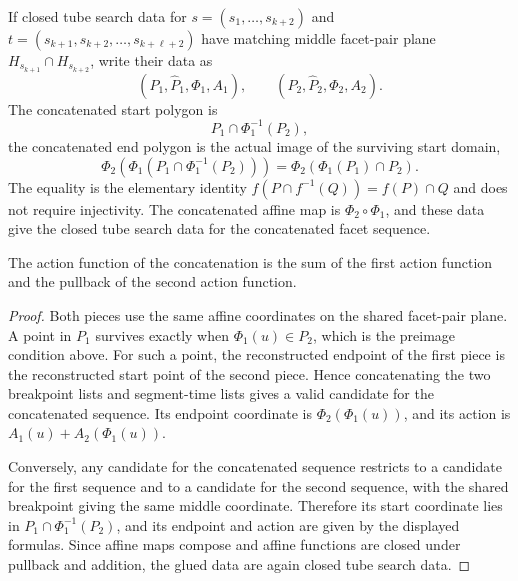 \begin{unverified}
\begin{lemma}\label{lem:fg-tube-gluing}
If closed tube search data for \(s=(s_1,\ldots,s_{k+2})\) and
\(t=(s_{k+1},s_{k+2},\ldots,s_{k+\ell+2})\) have matching middle
facet-pair plane \(H_{s_{k+1}}\cap H_{s_{k+2}}\), write their data as
\[
  (P_1,\widehat P_1,\Phi_1,A_1),
  \qquad
  (P_2,\widehat P_2,\Phi_2,A_2).
\]
The concatenated start polygon is
\[
  P_1\cap\Phi_1^{-1}(P_2),
\]
the concatenated end polygon is the actual image of the surviving start
domain,
\[
  \Phi_2\!\left(\Phi_1(P_1\cap\Phi_1^{-1}(P_2))\right)
  =\Phi_2\!\left(\Phi_1(P_1)\cap P_2\right).
\]
The equality is the elementary identity
\(f(P\cap f^{-1}(Q))=f(P)\cap Q\) and does not require injectivity.
The concatenated affine map is
\(\Phi_2\circ\Phi_1\), and these data give the closed tube search data for the
concatenated facet sequence.

The action function of the concatenation is the sum of the first action
function and the pullback of the second action function.
\end{lemma}

\begin{proof}
Both pieces use the same affine coordinates on the shared facet-pair plane.
A point in \(P_1\) survives exactly when \(\Phi_1(u)\in P_2\), which is the
preimage condition above.  For such a point, the reconstructed endpoint of the
first piece is the reconstructed start point of the second piece.  Hence
concatenating the two breakpoint lists and segment-time lists gives a valid
candidate for the concatenated sequence.  Its endpoint coordinate is
\(\Phi_2(\Phi_1(u))\), and its action is
\(A_1(u)+A_2(\Phi_1(u))\).

Conversely, any candidate for the concatenated sequence restricts to a
candidate for the first sequence and to a candidate for the second sequence,
with the shared breakpoint giving the same middle coordinate.  Therefore its
start coordinate lies in \(P_1\cap\Phi_1^{-1}(P_2)\), and its endpoint and
action are given by the displayed formulas.  Since affine maps compose and
affine functions are closed under pullback and addition, the glued data are
again closed tube search data.
\end{proof}
\end{unverified}

